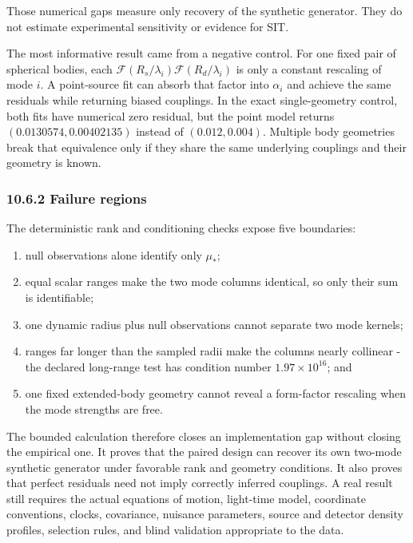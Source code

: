 \documentclass[
  american,
  11pt,
  letterpaper,
]{article}
\providecommand{\tightlist}{%
  \setlength{\itemsep}{0pt}\setlength{\parskip}{0pt}}
\begin{document}
Those numerical gaps measure only recovery of the synthetic generator. They do not estimate experimental sensitivity or evidence for SIT.

The most informative result came from a negative control. For one fixed pair of spherical bodies, each \(\mathcal F(R_s/\lambda_i)\mathcal F(R_d/\lambda_i)\) is only a constant rescaling of mode \(i\). A point-source fit can absorb that factor into \(\alpha_i\) and achieve the same residuals while returning biased couplings. In the exact single-geometry control, both fits have numerical zero residual, but the point model returns \((0.0130574,0.00402135)\) instead of \((0.012,0.004)\). Multiple body geometries break that equivalence only if they share the same underlying couplings and their geometry is known.

\subsubsection{10.6.2 Failure regions}\label{failure-regions}

The deterministic rank and conditioning checks expose five boundaries:

\begin{enumerate}
\def\labelenumi{\arabic{enumi}.}
\tightlist
\item
  null observations alone identify only \(\mu_*\);
\item
  equal scalar ranges make the two mode columns identical, so only their sum is identifiable;
\item
  one dynamic radius plus null observations cannot separate two mode kernels;
\item
  ranges far longer than the sampled radii make the columns nearly collinear - the declared long-range test has condition number \(1.97\times10^{16}\); and
\item
  one fixed extended-body geometry cannot reveal a form-factor rescaling when the mode strengths are free.
\end{enumerate}

The bounded calculation therefore closes an implementation gap without closing the empirical one. It proves that the paired design can recover its own two-mode synthetic generator under favorable rank and geometry conditions. It also proves that perfect residuals need not imply correctly inferred couplings. A real result still requires the actual equations of motion, light-time model, coordinate conventions, clocks, covariance, nuisance parameters, source and detector density profiles, selection rules, and blind validation appropriate to the data.
\end{document}
